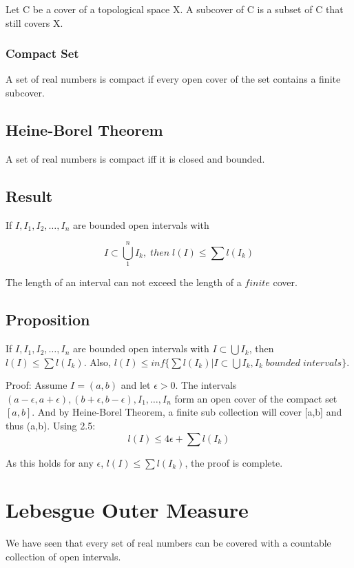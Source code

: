 \documentclass{article}
\begin{document}
 Let C be a cover of a topological space X. A subcover of C is a subset of C that still covers X.
 
 \subsubsection{Compact Set}
 
A set of real numbers is compact if every open cover of the set contains a finite subcover.

\subsection{Heine-Borel Theorem}
A set of real numbers is compact iff it is closed and bounded.

\subsection{Result}
If $I,I_1,I_2,\dots ,I_n$ are bounded open intervals with 

$$ I \subset \bigcup_{1}^{n}I_k ,\; then  \;l(I) \leq \sum l(I_k)$$

The length of an interval can not exceed the length of a $finite$ cover.

\subsection{Proposition}

If $I,I_1,I_2,\dots ,I_n$ are bounded open intervals with $ I \subset \bigcup I_k$, then $l(I) \leq \sum l(I_k)$. Also, $ l(I) \leq inf\{ \sum l(I_k) | I \subset \bigcup I_k, I_k \; bounded \; intervals \}$.\bigskip

Proof: Assume $I =(a,b)$ and let $\epsilon > 0$. The intervals $(a-\epsilon,a+\epsilon),(b+\epsilon,b-\epsilon),I_1,\dots ,I_n$ form an open cover of the compact set $[a,b]$. And by Heine-Borel Theorem, a finite sub collection will cover [a,b] and thus (a,b).
Using 2.5:
$$  l(I) \leq 4\epsilon +  \sum l(I_k)$$

As this holds for any $\epsilon$, $l(I) \leq \sum l(I_k)$, the proof is complete.
\section{Lebesgue Outer Measure}

We have seen that every set of real numbers can be covered with a countable collection of open intervals.
\end{document}

